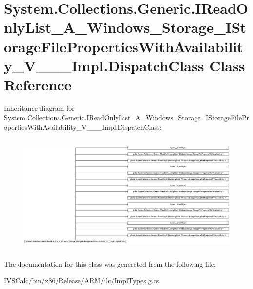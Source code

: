 \hypertarget{class_system_1_1_collections_1_1_generic_1_1_i_read_only_list___a___windows___storage___i_storag956cbc4d9ea41b4215cae95b5d2afb60}{}\section{System.\+Collections.\+Generic.\+I\+Read\+Only\+List\+\_\+\+A\+\_\+\+Windows\+\_\+\+Storage\+\_\+\+I\+Storage\+File\+Properties\+With\+Availability\+\_\+\+V\+\_\+\+\_\+\+\_\+\+Impl.\+Dispatch\+Class Class Reference}
\label{class_system_1_1_collections_1_1_generic_1_1_i_read_only_list___a___windows___storage___i_storag956cbc4d9ea41b4215cae95b5d2afb60}
Inheritance diagram for System.\+Collections.\+Generic.\+I\+Read\+Only\+List\+\_\+\+A\+\_\+\+Windows\+\_\+\+Storage\+\_\+\+I\+Storage\+File\+Properties\+With\+Availability\+\_\+\+V\+\_\+\+\_\+\+\_\+\+Impl.\+Dispatch\+Class\+:\begin{figure}[H]
\begin{center}
\leavevmode
\includegraphics[height=6.029610cm]{class_system_1_1_collections_1_1_generic_1_1_i_read_only_list___a___windows___storage___i_storag956cbc4d9ea41b4215cae95b5d2afb60}
\end{center}
\end{figure}


The documentation for this class was generated from the following file\+:\begin{DoxyCompactItemize}
\item 
I\+V\+S\+Calc/bin/x86/\+Release/\+A\+R\+M/ilc/Impl\+Types.\+g.\+cs\end{DoxyCompactItemize}

